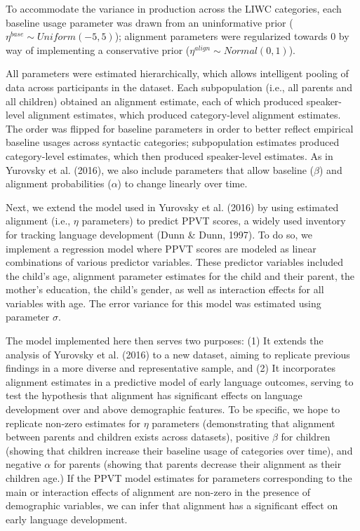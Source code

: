 \documentclass[10pt, letterpaper]{article}
\begin{document}
To accommodate the variance in production across the LIWC categories,
each baseline usage parameter was drawn from an uninformative prior
(\(\eta^{base} \sim Uniform(-5,5)\)); alignment parameters were
regularized towards 0 by way of implementing a conservative prior
(\(\eta^{align} \sim Normal(0,1)\)).

All parameters were estimated hierarchically, which allows intelligent
pooling of data across participants in the dataset. Each subpopulation
(i.e., all parents and all children) obtained an alignment estimate,
each of which produced speaker-level alignment estimates, which produced
category-level alignment estimates. The order was flipped for baseline
parameters in order to better reflect empirical baseline usages across
syntactic categories; subpopulation estimates produced category-level
estimates, which then produced speaker-level estimates. As in Yurovsky
et al. (2016), we also include parameters that allow baseline
(\(\beta\)) and alignment probabilities (\(\alpha\)) to change linearly
over time.

Next, we extend the model used in Yurovsky et al. (2016) by using
estimated alignment (i.e., \(\eta\) parameters) to predict PPVT scores,
a widely used inventory for tracking language development (Dunn \& Dunn,
1997). To do so, we implement a regression model where PPVT scores are
modeled as linear combinations of various predictor variables. These
predictor variables included the child's age, alignment parameter
estimates for the child and their parent, the mother's education, the
child's gender, as well as interaction effects for all variables with
age. The error variance for this model was estimated using parameter
\(\sigma\).

The model implemented here then serves two purposes: (1) It extends the
analysis of Yurovsky et al. (2016) to a new dataset, aiming to replicate
previous findings in a more diverse and representative sample, and (2)
It incorporates alignment estimates in a predictive model of early
language outcomes, serving to test the hypothesis that alignment has
significant effects on language development over and above demographic
features. To be specific, we hope to replicate non-zero estimates for
\(\eta\) parameters (demonstrating that alignment between parents and
children exists across datasets), positive \(\beta\) for children
(showing that children increase their baseline usage of categories over
time), and negative \(\alpha\) for parents (showing that parents
decrease their alignment as their children age.) If the PPVT model
estimates for parameters corresponding to the main or interaction
effects of alignment are non-zero in the presence of demographic
variables, we can infer that alignment has a significant effect on early
language development.
\end{document}
